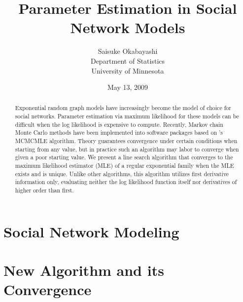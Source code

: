 \documentclass{amsbook}
\title{Parameter Estimation in Social Network Models}
\author{Saisuke Okabayashi \\ Department of Statistics \\ University of Minnesota}
\date{May 13, 2009}
\theoremstyle{definition}
\theoremstyle{remark}
\theoremstyle{ex}
\numberwithin{theorem}{chapter}
\numberwithin{corollary}{chapter}
\numberwithin{equation}{chapter}
\numberwithin{prop}{chapter}
\numberwithin{lemma}{chapter}
\numberwithin{remark}{chapter}
\numberwithin{exampleA}{chapter}
\begin{document}
 \maketitle

\begin{abstract}
Exponential random graph models have increasingly become the model of choice for social networks.  Parameter estimation via maximum likelihood for these models can be difficult when the log likelihood is expensive to compute.  Recently, Markov chain Monte Carlo methods have been implemented into software packages based on \citeauthor{Geyer:1992}'s \citeyearpar{Geyer:1992} MCMCMLE algorithm.  Theory guarantees convergence under certain conditions when starting from any value, but in practice such an algorithm may labor to converge when given a poor starting value.  We present a line search algorithm that converges to the maximum likelihood estimator (MLE) of a regular exponential family when the MLE exists and is unique.  Unlike other algorithms, this algorithm utilizes first derivative information only, evaluating neither the log likelihood function itself nor derivatives of higher order than first.
\end{abstract}



\setcounter{page}{0}
\thispagestyle{empty}

\chapter{Social Network Modeling}



\chapter{New Algorithm and its Convergence}







\end{document}
